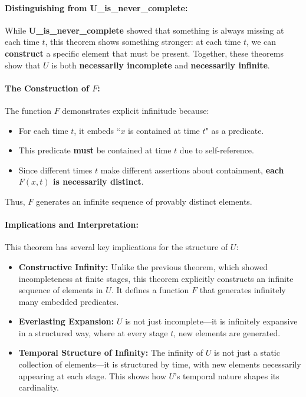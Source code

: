 \documentclass[12pt]{article}
\begin{document}
\paragraph{Distinguishing from U\_is\_never\_complete:}
While \textbf{U\_is\_never\_complete} showed that something is always missing at each time \( t \), this theorem shows something stronger: at each time \( t \), we can \textbf{construct} a specific element that must be present. Together, these theorems show that \( U \) is both \textbf{necessarily incomplete} and \textbf{necessarily infinite}.

\paragraph{The Construction of \( F \):}
The function \( F \) demonstrates explicit infinitude because:
\begin{itemize}
    \item For each time \( t \), it embeds ``\( x \) is contained at time \( t \)" as a predicate.
    \item This predicate \textbf{must} be contained at time \( t \) due to self-reference.
    \item Since different times \( t \) make different assertions about containment, \textbf{each \( F(x, t) \) is necessarily distinct}. 
\end{itemize}
Thus, \( F \) generates an infinite sequence of provably distinct elements.

\paragraph{Implications and Interpretation:}
This theorem has several key implications for the structure of \( U \):

\begin{itemize}
    \item \textbf{Constructive Infinity:} Unlike the previous theorem, which showed incompleteness at finite stages, this theorem explicitly constructs an infinite sequence of elements in \( U \). It defines a function \( F \) that generates infinitely many embedded predicates.
    \item \textbf{Everlasting Expansion:} \( U \) is not just incomplete—it is infinitely expansive in a structured way, where at every stage \( t \), new elements are generated.
    \item \textbf{Temporal Structure of Infinity:} The infinity of \( U \) is not just a static collection of elements—it is structured by time, with new elements necessarily appearing at each stage. This shows how \( U \)'s temporal nature shapes its cardinality.
\end{itemize}
\end{document}

